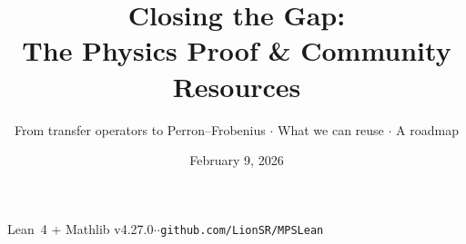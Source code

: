 \documentclass[aspectratio=169,10pt]{beamer}
\title{\textbf{Closing the Gap:\\The Physics Proof \& Community Resources}}
\subtitle{{\small From transfer operators to Perron--Frobenius  $\cdot$  What we can reuse  $\cdot$  A roadmap}}
\date{February 9, 2026}
\author{}
\begin{document}
{%
\begin{frame}
\vspace{-2em}
\maketitle
\vspace{-2em}
\begin{center}
{\footnotesize Lean~4 + Mathlib v4.27.0\quad$\cdot$\quad\cite{Cirac2021Matrix}\quad$\cdot$\quad\texttt{github.com/LionSR/MPSLean}}
\end{center}
\end{frame}
}
\end{document}
